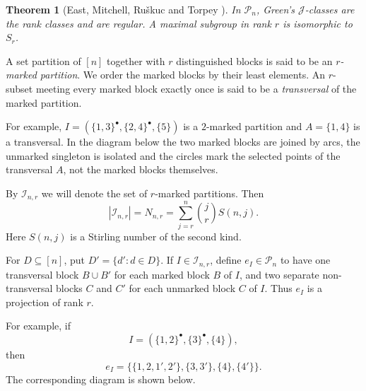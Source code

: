 \documentclass[11pt]{article}
\theoremstyle{plain}
\theoremstyle{remark}
\theoremstyle{definition}
\theoremstyle{plain}
\newtheorem*{quotedtheorem}{Theorem}
\begin{document}
\begin{quotedtheorem}[East, Mitchell, Ru\v{s}kuc and Torpey
{\cite[Proposition~2.1 and Remark~2.2(vii)]{EastMitchellRuskucTorpey}}]
In $\mathcal P_n$, Green's $\mathcal J$-classes are the rank classes and are
regular. A maximal subgroup in rank $r$ is isomorphic to $S_r$. %
\end{quotedtheorem}

A set partition of $[n]$ together with $r$ distinguished blocks is said to
be an \emph{$r$-marked partition}. We order the marked blocks by their least
elements. An $r$-subset meeting every marked block exactly once is said to be
a \emph{transversal} of the marked partition.

\begingroup
For example,
$I=(\{1,3\}^{\bullet},\{2,4\}^{\bullet},\{5\})$ is a $2$-marked
partition and $A=\{1,4\}$ is a transversal. In the diagram below the two
marked blocks are joined by arcs, the unmarked singleton is isolated and the
circles mark the selected points of the transversal $A$, not the
marked blocks themselves.
\begin{center}
\end{center}
\endgroup
By $\mathcal I_{n,r}$ we will
denote the set of $r$-marked partitions. Then
\[
        |\mathcal I_{n,r}|=N_{n,r}=\sum_{j=r}^n\binom{j}{r}S(n,j).
\]
Here $S(n,j)$ is a Stirling number of the second kind.

\begingroup
\color{black}
For $D\subseteq[n]$, put $D'=\{d':d\in D\}$. If
$I\in\mathcal I_{n,r}$, define $e_I\in\mathcal P_n$ to have one
transversal block $B\cup B'$ for each marked block $B$ of $I$, and two
separate non-transversal blocks $C$ and $C'$ for each unmarked block $C$
of $I$. Thus $e_I$ is a projection of rank $r$.
\endgroup

\begin{samepage}
\begingroup
\color{black}
For example, if
\[
I=(\{1,2\}^{\bullet},\{3\}^{\bullet},\{4\}),
\]
then
\[
        e_I=\{\{1,2,1',2'\},\{3,3'\},\{4\},\{4'\}\}.
\]
The corresponding diagram is shown below.
\endgroup

\begin{center}
\end{center}
\end{samepage}
\end{document}
